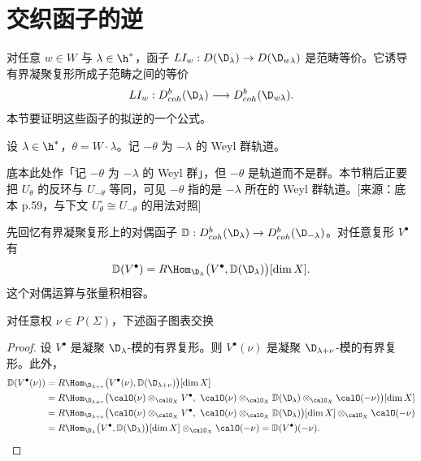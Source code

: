 \section{交织函子的逆}\label{sec:03.3.4}

对任意 $w\in W$ 与 $\lambda\in\h^*$，函子 $LI_w:D(\D_\lambda)\to D(\D_{w\lambda})$ 是范畴等价。它诱导有界凝聚复形所成子范畴之间的等价
$$LI_w:D^b_{coh}(\D_\lambda)\longrightarrow D^b_{coh}(\D_{w\lambda}).$$
本节要证明这些函子的拟逆的一个公式。

设 $\lambda\in\h^*$，$\theta=W\cdot\lambda$。记 $-\theta$ 为 $-\lambda$ 的 Weyl 群轨道。
\begin{annote}
底本此处作「记 $-\theta$ 为 $-\lambda$ 的 Weyl 群」，但 $-\theta$ 是轨道而不是群。本节稍后正要把 $U_\theta$ 的反环与 $U_{-\theta}$ 等同，可见 $-\theta$ 指的是 $-\lambda$ 所在的 Weyl 群轨道。[来源：底本 p.59，与下文 $U_\theta^\circ\cong U_{-\theta}$ 的用法对照]
\end{annote}

先回忆有界凝聚复形上的对偶函子 $\mathbb{D}:D^b_{coh}(\D_\lambda)\to D^b_{coh}(\D_{-\lambda})$。对任意复形 $V^\bullet$ 有
$$\mathbb{D}(V^\bullet)=R\Hom_{\D_\lambda}\bigl(V^\bullet,\mathbb{D}(\D_\lambda)\bigr)[\dim X].$$
这个对偶运算与张量积相容。

\begin{lemma}\label{lem:03.4.1}
对任意权 $\nu\in P(\Sigma)$，下述函子图表交换
\begin{center}
\end{center}
\end{lemma}

\begin{proof}
设 $V^\bullet$ 是凝聚 $\D_\lambda$-模的有界复形。则 $V^\bullet(\nu)$ 是凝聚 $\D_{\lambda+\nu}$-模的有界复形。此外，
{\small
\begin{align*}
\mathbb{D}(V^\bullet(\nu))
&=R\Hom_{\D_{\lambda+\nu}}\bigl(V^\bullet(\nu),\mathbb{D}(\D_{\lambda+\nu})\bigr)[\dim X]\\
&=R\Hom_{\D_{\lambda+\nu}}\bigl(\calO(\nu)\otimes_{\calO_X}V^\bullet,\ \calO(\nu)\otimes_{\calO_X}\mathbb{D}(\D_\lambda)\otimes_{\calO_X}\calO(-\nu)\bigr)[\dim X]\\
&=R\Hom_{\D_{\lambda+\nu}}\bigl(\calO(\nu)\otimes_{\calO_X}V^\bullet,\ \calO(\nu)\otimes_{\calO_X}\mathbb{D}(\D_\lambda)\bigr)[\dim X]\otimes_{\calO_X}\calO(-\nu)\\
&=R\Hom_{\D_\lambda}\bigl(V^\bullet,\mathbb{D}(\D_\lambda)\bigr)[\dim X]\otimes_{\calO_X}\calO(-\nu)
=\mathbb{D}(V^\bullet)(-\nu).
\end{align*}}
\end{proof}

